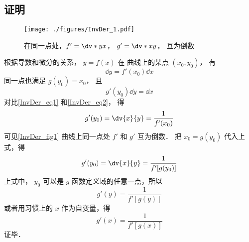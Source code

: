 \subsection{证明}
\begin{figure}[ht]
\centering
\texttt{[image: ./figures/InvDer\_1.pdf]}
\caption{在同一点处，$f'=\dv*{y}{x}$， $g'=\dv*{x}{y}$， 互为倒数}\label{InvDer_fig1}
\end{figure}
根据导数和微分的关系， $y = f(x)$ 在 曲线上的某点 $(x_0, y_0)$， 有
 \begin{equation}\label{InvDer_eq1}
\dd{y} = f'(x_0) \dd{x}
\end{equation}
同一点也满足 $g(y_0) = x_0$， 且
 \begin{equation}\label{InvDer_eq2}
g'(y_0)\dd{y} = \dd{x}
\end{equation}
对比\autoref{InvDer_eq1} 和\autoref{InvDer_eq2}， 得
\begin{equation}
g'(y_0) = \dv{x}{y} = \frac{1}{f'(x_0)}
\end{equation}
可见\autoref{InvDer_fig1} 曲线上同一点处 $f'$ 和 $g'$ 互为倒数． 把 ${x_0} = g(y_0)$ 代入上式，得
\begin{equation}
g'(y_0) = \dv{x}{y} = \frac{1}{f'[g(y_0)]}
\end{equation} 
上式中， $y_0$ 可以是 $g$ 函数定义域的任意一点，所以
\begin{equation}
g'(y) = \frac{1}{f'[g(y)]}
\end{equation} 
或者用习惯上的 $x$ 作为自变量，得
\begin{equation}
g'(x) = \frac{1}{f'[g(x)]}
\end{equation}
证毕．
















